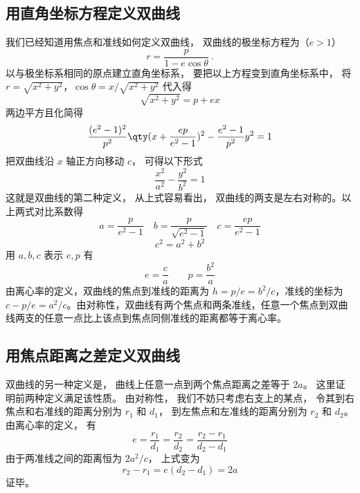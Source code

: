 


\subsection{用直角坐标方程定义双曲线}
我们已经知道用焦点和准线如何定义双曲线， 双曲线的极坐标方程为（$e>1$）
\begin{equation}
r = \frac{p}{1 - e\cos \theta }~.
\end{equation}
以与极坐标系相同的原点建立直角坐标系， 要把以上方程变到直角坐标系中， 将$r = \sqrt{x^2 + y^2}$，$\cos \theta  = x/\sqrt{x^2 + y^2}$ 代入得
\begin{equation}
\sqrt{x^2 + y^2}  = p + ex
\end{equation}
两边平方且化简得
\begin{equation}
\frac{(e^2 - 1)^2}{p^2} \qty(x + \frac{ep}{e^2 - 1} )^2 - \frac{e^2 - 1}{p^2} y^2 = 1
\end{equation}
把双曲线沿 $x$ 轴正方向移动 $c$， 可得以下形式
\begin{equation}\label{eq_Hypb3_4}
\frac{x^2}{a^2} - \frac{y^2}{b^2} = 1
\end{equation}
这就是双曲线的第二种定义， 从上式容易看出， 双曲线的两支是左右对称的。以上两式对比系数得
\begin{equation}
a = \frac{p}{e^2 - 1} \quad  b = \frac{p}{\sqrt{e^2 - 1} } \quad c = \frac{ep}{e^2 - 1}
\end{equation}
\begin{equation}
c^2 = a^2 + b^2
\end{equation}
用 $a, b, c$ 表示 $e,p$ 有
\begin{equation}
e = \frac{c}{a} \qquad p = \frac{b^2}{a}
\end{equation}
由离心率的定义，双曲线的焦点到准线的距离为 $h = p/e=b^2/c$，准线的坐标为 $c-p/e = a^2/c$。由对称性，双曲线有两个焦点和两条准线，任意一个焦点到双曲线两支的任意一点比上该点到焦点同侧准线的距离都等于离心率。

\subsection{用焦点距离之差定义双曲线}
双曲线的另一种定义是， 曲线上任意一点到两个焦点距离之差等于 $2a$。 这里证明前两种定义满足该性质。 由对称性， 我们不妨只考虑右支上的某点， 令其到右焦点和右准线的距离分别为 $r_1$ 和 $d_1$， 到左焦点和左准线的距离分别为 $r_2$ 和 $d_2$。 由离心率的定义， 有
\begin{equation}
e = \frac{r_1}{d_1} = \frac{r_2}{d_2} = \frac{r_2 - r_1}{d_2 - d_1}
\end{equation}
由于两准线之间的距离恒为 $2a^2/c$， 上式变为
\begin{equation}
r_2 - r_1 = e(d_2 - d_1) = 2a
\end{equation}
证毕。

